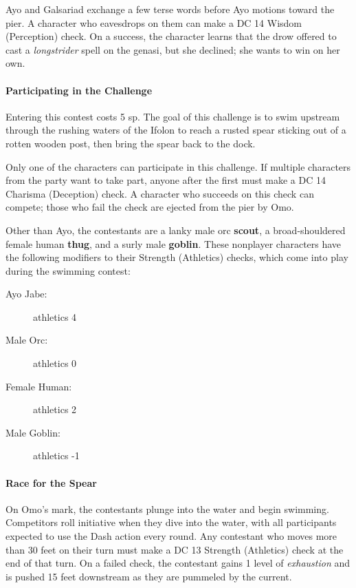 \documentclass[letterpaper, 11pt, bg=full, twocolumn]{dndbook}
\begin{document}
Ayo and Galsariad exchange a few terse words before Ayo motions toward the pier. A character who eavesdrops on them can make a DC 14 Wisdom (Perception) check. On a success, the character learns that the drow offered to cast a \textit{longstrider} spell on the genasi, but she declined; she wants to win on her own.

\paragraph{Participating in the Challenge}

Entering this contest costs 5 sp. The goal of this challenge is to swim upstream through the rushing waters of the Ifolon to reach a rusted spear sticking out of a rotten wooden post, then bring the spear back to the dock.

Only one of the characters can participate in this challenge. If multiple characters from the party want to take part, anyone after the first must make a DC 14 Charisma (Deception) check. A character who succeeds on this check can compete; those who fail the check are ejected from the pier by Omo.

Other than Ayo, the contestants are a lanky male orc \textbf{scout}, a broad-shouldered female human \textbf{thug}, and a surly male \textbf{goblin}. These nonplayer characters have the following modifiers to their Strength (Athletics) checks, which come into play during the swimming contest:

\begin{description}
\item[Ayo Jabe:] athletics 4
\item[Male Orc:] athletics 0
\item[Female Human:] athletics 2
\item[Male Goblin:] athletics -1
\end{description}

\paragraph{Race for the Spear}

On Omo's mark, the contestants plunge into the water and begin swimming. Competitors roll initiative when they dive into the water, with all participants expected to use the Dash action every round. Any contestant who moves more than 30 feet on their turn must make a DC 13 Strength (Athletics) check at the end of that turn. On a failed check, the contestant gains 1 level of \textit{exhaustion} and is pushed 15 feet downstream as they are pummeled by the current.
\end{document}
